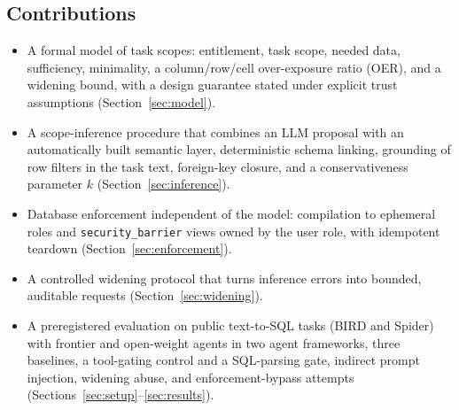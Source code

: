 \subsection{Contributions}
\begin{itemize}
\item[\textbf{C1}] A formal model of task scopes: entitlement, task scope, needed data, sufficiency, minimality, a
column/row/cell over-exposure ratio (OER), and a widening bound, with a design guarantee stated under explicit trust
assumptions (Section~\ref{sec:model}).
\item[\textbf{C2}] A scope-inference procedure that combines an LLM proposal with an automatically built semantic
layer, deterministic schema linking, grounding of row filters in the task text, foreign-key closure, and a
conservativeness parameter $k$ (Section~\ref{sec:inference}).
\item[\textbf{C3}] Database enforcement independent of the model: compilation to ephemeral roles and
\texttt{security\_barrier} views owned by the user role, with idempotent teardown (Section~\ref{sec:enforcement}).
\item[\textbf{C4}] A controlled widening protocol that turns inference errors into bounded, auditable requests
(Section~\ref{sec:widening}).
\item[\textbf{C5}] A preregistered evaluation on \nTasks{} public text-to-SQL tasks (BIRD and Spider) with frontier
and open-weight agents in two agent frameworks, three baselines, a tool-gating control and a SQL-parsing gate, indirect prompt injection, widening abuse, and
\bypassAttempts{} enforcement-bypass attempts (Sections~\ref{sec:setup}--\ref{sec:results}).
\end{itemize}


